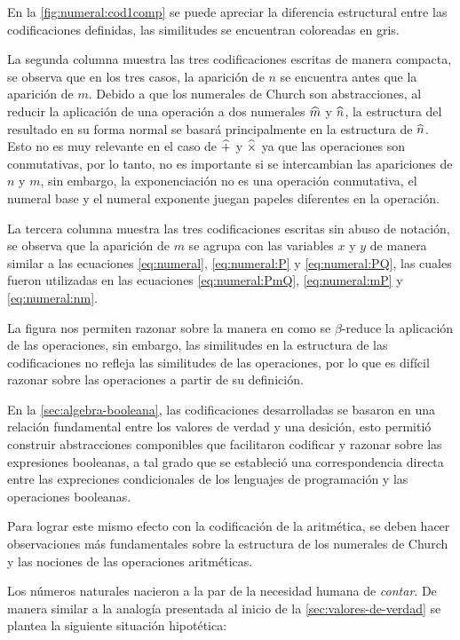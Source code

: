 En la \autoref{fig:numeral:cod1comp} se puede apreciar la diferencia estructural entre las codificaciones definidas, las similitudes se encuentran coloreadas en gris.

La segunda columna muestra las tres codificaciones escritas de manera compacta, se observa que en los tres casos, la aparición de $ n $ se encuentra antes que la aparición de $ m $. Debido a que los numerales de Church son abstracciones, al reducir la aplicación de una operación a dos numerales $ \widehat{m} $ y $ \widehat{n} $, la estructura del resultado en su forma normal se basará principalmente en la estructura de $ \widehat{n} $. Esto no es muy relevante en el caso de $ \widehat{+} $ y $ \widehat{\times} $ ya que las operaciones son conmutativas, por lo tanto, no es importante si se intercambian las apariciones de $ n $ y $ m $, sin embargo, la exponenciación no es una operación conmutativa, el numeral base y el numeral exponente juegan papeles diferentes en la operación.

La tercera columna muestra las tres codificaciones escritas sin abuso de notación, se observa que la aparición de $ m $ se agrupa con las variables $ x $ y $ y $ de manera similar a las ecuaciones \eqref{eq:numeral}, \eqref{eq:numeral:P} y \eqref{eq:numeral:PQ}, las cuales fueron utilizadas en las ecuaciones \eqref{eq:numeral:PmQ}, \eqref{eq:numeral:mP} y \eqref{eq:numeral:nm}.

La figura nos permiten razonar sobre la manera en como se $ β $-reduce la aplicación de las operaciones, sin embargo, las similitudes en la estructura de las codificaciones no refleja las similitudes de las operaciones, por lo que es difícil razonar sobre las operaciones a partir de su definición.

En la \autoref{sec:algebra-booleana}, las codificaciones desarrolladas se basaron en una relación fundamental entre los valores de verdad y una desición, esto permitió construir abstracciones componibles que facilitaron codificar y razonar sobre las expresiones booleanas, a tal grado que se estableció una correspondencia directa entre las expreciones condicionales de los lenguajes de programación y las operaciones booleanas.

Para lograr este mismo efecto con la codificación de la aritmética, se deben hacer observaciones más fundamentales sobre la estructura de los numerales de Church y las nociones de las operaciones aritméticas.

Los números naturales nacieron a la par de la necesidad humana de \emph{contar}. De manera similar a la analogía presentada al inicio de la \autoref{sec:valores-de-verdad} se plantea la siguiente situación hipotética:

